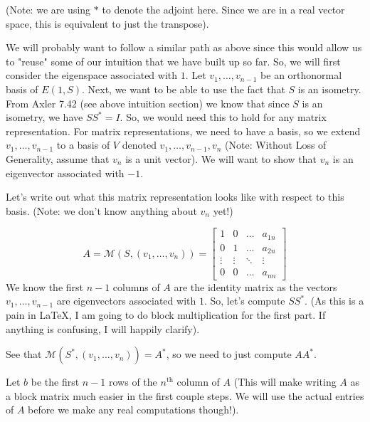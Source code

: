 \documentclass[answers]{exam}
\newcommand{\M}[1]{\mathcal{M}\left(#1\right)}
\newcommand{\latex}{\LaTeX}
\begin{document}
\begin{questions}
\begin{parts}
\begin{solution}
            (Note: we are using $*$ to denote the adjoint here. Since we are in a real vector space, this is 
            equivalent to just the transpose).

             We will probably want to follow a similar path as above since this would allow us
            to "reuse" some of our intuition that we have built up so far. So, we will first consider the 
            eigenspace associated with $1$. Let $v_1,\dots,v_{n-1}$ be an orthonormal basis of $E(1,S)$. Next, 
            we want to be able to use the fact that $S$ is an isometry. From Axler 7.42 (see above intuition 
            section) we know that since $S$ is an isometry, we have $SS^* = I$. So, we would need this to hold
            for any matrix representation. For matrix representations, we need to have a basis, so we extend
            $v_1,\dots,v_{n-1}$ to a basis of $V$ denoted $v_1,\dots, v_{n-1}, v_n$ (Note: Without Loss of 
            Generality, assume that $v_n$ is a unit vector). We will want to show that
            $v_n$ is an eigenvector associated with $-1$. 

            Let's write out what this matrix representation looks 
            like with respect to this basis. (Note: we don't know anything about $v_n$ yet!)

            \[
                A = \M{S,(v_1,\dots,v_n)} = \begin{bmatrix}
                    1 & 0 & \dots & a_{1n} \\
                    0 & 1 & \dots & a_{2n} \\
                    \vdots &\vdots&\ddots & \vdots \\
                    0 & 0 & \dots & a_{nn}
                \end{bmatrix}
            \]
            We know the first $n-1$ columns of $A$ are the identity matrix as the vectors $v_1,\dots,v_{n-1}$
            are eigenvectors associated with $1$. So, let's compute $SS^*$. (As this is a pain in \latex, I am
            going to do block multiplication for the first part. If anything is confusing, I will happily 
            clarify).

            See that $\M{S^*,(v_1,\dots,v_n)} = A^*$, so we need to just compute $AA^*$.

            Let $b$ be the first $n-1$ rows of the $n^\text{th}$ column of $A$ (This will make writing $A$ as a
            block matrix much easier in the first couple steps. We will use the actual entries of $A$ before
            we make any real computations though!).


\end{solution}
\end{parts}
\end{questions}
\end{document}

